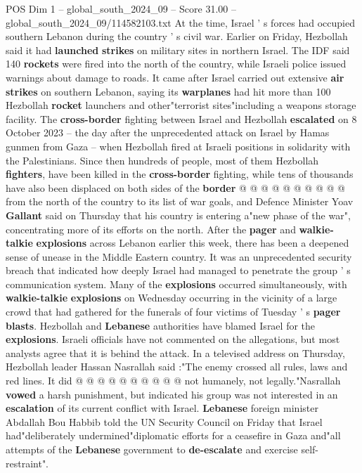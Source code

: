 \begin{textsample}{POS Dim 1 – global\_south\_2024\_09 – Score 31.00 – global\_south\_2024\_09/114582103.txt}
At the time, Israel ' s forces had occupied southern Lebanon during the country ' s civil war.
Earlier on Friday, Hezbollah said it had \textbf{launched} \textbf{strikes} on military sites in northern Israel.
The IDF said 140 \textbf{rockets} were fired into the north of the country, while Israeli police issued warnings about damage to roads.
It came after Israel carried out extensive \textbf{air} \textbf{strikes} on southern Lebanon, saying its \textbf{warplanes} had hit more than 100 Hezbollah \textbf{rocket} launchers and other"terrorist sites"including a weapons storage facility.
The \textbf{cross-border} fighting between Israel and Hezbollah \textbf{escalated} on 8 October 2023 -- the day after the unprecedented attack on Israel by Hamas gunmen from Gaza -- when Hezbollah fired at Israeli positions in solidarity with the Palestinians.
Since then hundreds of people, most of them Hezbollah \textbf{fighters}, have been killed in the \textbf{cross-border} fighting, while tens of thousands have also been displaced on both sides of the \textbf{border} @ @ @ @ @ @ @ @ @ @ from the north of the country to its list of war goals, and Defence Minister Yoav \textbf{Gallant} said on Thursday that his country is entering a"new phase of the war", concentrating more of its efforts on the north.
After the \textbf{pager} and \textbf{walkie-talkie} \textbf{explosions} across Lebanon earlier this week, there has been a deepened sense of unease in the Middle Eastern country.
It was an unprecedented security breach that indicated how deeply Israel had managed to penetrate the group ' s communication system.
Many of the \textbf{explosions} occurred simultaneously, with \textbf{walkie-talkie} \textbf{explosions} on Wednesday occurring in the vicinity of a large crowd that had gathered for the funerals of four victims of Tuesday ' s \textbf{pager} \textbf{blasts}.
Hezbollah and \textbf{Lebanese} authorities have blamed Israel for the \textbf{explosions}.
Israeli officials have not commented on the allegations, but most analysts agree that it is behind the attack.
In a televised address on Thursday, Hezbollah leader Hassan Nasrallah said :"The enemy crossed all rules, laws and red lines.
It did @ @ @ @ @ @ @ @ @ @ not humanely, not legally."Nasrallah \textbf{vowed} a harsh punishment, but indicated his group was not interested in an \textbf{escalation} of its current conflict with Israel. \textbf{Lebanese} foreign minister Abdallah Bou Habbib told the UN Security Council on Friday that Israel had"deliberately undermined"diplomatic efforts for a ceasefire in Gaza and"all attempts of the \textbf{Lebanese} government to \textbf{de-escalate} and exercise self-restraint".

\end{textsample}
